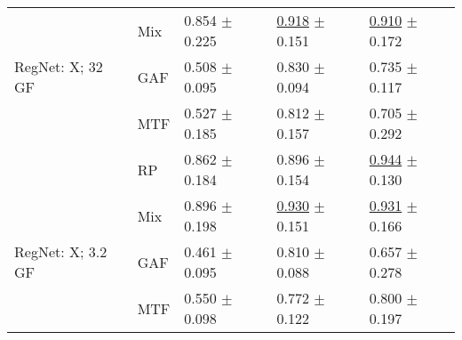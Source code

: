 \begin{tabular}{lllll}
 & Mix & \textcolor[rgb]{0.1213235294,0.5000000000,0}{0.854} $\pm$ \textcolor[rgb]{0.8044733801,0.1955266199,0}{0.225} & \underline{\textcolor[rgb]{0.1235059761,0.5000000000,0}{0.918}} $\pm$ \textcolor[rgb]{0.5014751378,0.4985248622,0}{0.151} & \underline{\textcolor[rgb]{0.1865183246,0.5000000000,0}{0.910}} $\pm$ \textcolor[rgb]{0.3489762354,0.5000000000,0}{0.172} \\
RegNet: X; 32 GF & GAF & \textcolor[rgb]{0.7941176471,0.2058823529,0}{0.508} $\pm$ \textcolor[rgb]{0.3384023183,0.5000000000,0}{0.095} & \textcolor[rgb]{0.4165157552,0.5000000000,0}{0.830} $\pm$ \textcolor[rgb]{0.1845642668,0.5000000000,0}{0.094} & \textcolor[rgb]{0.7303664921,0.2696335079,0}{0.735} $\pm$ \textcolor[rgb]{0.0793065982,0.5000000000,0}{0.117} \\
 & MTF & \textcolor[rgb]{0.7558823529,0.2441176471,0}{0.527} $\pm$ \textcolor[rgb]{0.6607913145,0.3392086855,0}{0.185} & \textcolor[rgb]{0.4780876494,0.5000000000,0}{0.812} $\pm$ \textcolor[rgb]{0.5338881645,0.4661118355,0}{0.157} & \textcolor[rgb]{0.8246073298,0.1753926702,0}{0.705} $\pm$ \textcolor[rgb]{0.9330630893,0.0669369107,0}{0.292} \\
 & RP & \textcolor[rgb]{0.1051470588,0.5000000000,0}{0.862} $\pm$ \textcolor[rgb]{0.6560512372,0.3439487628,0}{0.184} & \textcolor[rgb]{0.1952191235,0.5000000000,0}{0.896} $\pm$ \textcolor[rgb]{0.5211856654,0.4788143346,0}{0.154} & \underline{\textcolor[rgb]{0.0785340314,0.5000000000,0}{0.944}} $\pm$ \textcolor[rgb]{0.1425478198,0.5000000000,0}{0.130} \\
 & Mix & \textcolor[rgb]{0.0404411765,0.5000000000,0}{0.896} $\pm$ \textcolor[rgb]{0.7085309655,0.2914690345,0}{0.198} & \underline{\textcolor[rgb]{0.0836653386,0.5000000000,0}{0.930}} $\pm$ \textcolor[rgb]{0.5037641267,0.4962358733,0}{0.151} & \underline{\textcolor[rgb]{0.1217277487,0.5000000000,0}{0.931}} $\pm$ \textcolor[rgb]{0.3194008772,0.5000000000,0}{0.166} \\
RegNet: X; 3.2 GF & GAF & \textcolor[rgb]{0.8843137255,0.1156862745,0}{0.461} $\pm$ \textcolor[rgb]{0.3401454464,0.5000000000,0}{0.095} & \textcolor[rgb]{0.4860557769,0.5000000000,0}{0.810} $\pm$ \textcolor[rgb]{0.1521613589,0.5000000000,0}{0.088} & \textcolor[rgb]{0.9712041885,0.0287958115,0}{0.657} $\pm$ \textcolor[rgb]{0.8640492700,0.1359507300,0}{0.278} \\
 & MTF & \textcolor[rgb]{0.7117647059,0.2882352941,0}{0.550} $\pm$ \textcolor[rgb]{0.3491926171,0.5000000000,0}{0.098} & \textcolor[rgb]{0.6119521912,0.3880478088,0}{0.772} $\pm$ \textcolor[rgb]{0.3411929565,0.5000000000,0}{0.122} & \textcolor[rgb]{0.5277486911,0.4722513089,0}{0.800} $\pm$ \textcolor[rgb]{0.4713189562,0.5000000000,0}{0.197} \\

\end{tabular}
